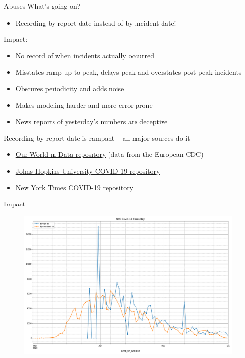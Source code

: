 \documentclass[aspectratio=169]{beamer}
\begin{document}
\begin{frame}{Abuses}
  What's going on?
  \begin{itemize}
  \item Recording by report date instead of by incident date!
  \end{itemize}
  
  Impact:
  \begin{itemize}
  \item No record of when incidents actually occurred
  \item Misstates ramp up to peak, delays peak and overstates
    post-peak incidents
  \item Obscures periodicity and adds noise
  \item Makes modeling harder and more error prone
  \item News reports of yesterday's numbers are deceptive
  \end{itemize}

  Recording by report date is rampant -- all major sources do it:
  \begin{itemize}
  \item \href{https://github.com/owid/covid-19-data}{Our World in Data
    repository} (data from the European CDC)
  \item \href{https://github.com/CSSEGISandData/COVID-19}{Johns Hopkins
    University COVID-19 repository}
  \item \href{https://github.com/nytimes/covid-19-data}{New York Times
    COVID-19 repository}
  \end{itemize}
\end{frame}

\begin{frame}{Impact}
  \begin{figure}
    \centering
    \includegraphics[height=.8\textheight]{../Notebooks/casesPerDayHistoryRptDtVsInDtRaw.png}
  \end{figure}
\end{frame}
\end{document}
